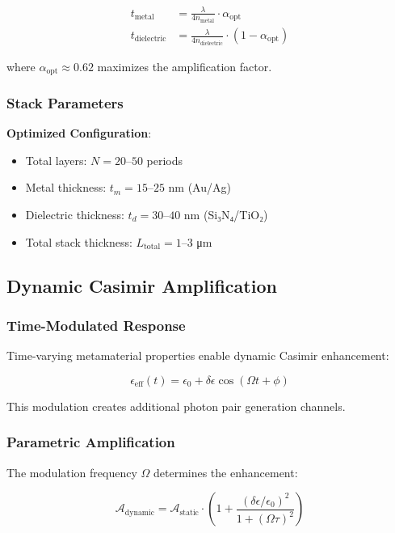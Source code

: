 \begin{align}
t_{\text{metal}} &= \frac{\lambda}{4n_{\text{metal}}} \cdot \alpha_{\text{opt}} \\
t_{\text{dielectric}} &= \frac{\lambda}{4n_{\text{dielectric}}} \cdot (1 - \alpha_{\text{opt}})
\end{align}

where $\alpha_{\text{opt}} \approx 0.62$ maximizes the amplification factor.

\subsubsection{Stack Parameters}

\textbf{Optimized Configuration}:
\begin{itemize}
\item Total layers: $N = 20$--$50$ periods
\item Metal thickness: $t_m = 15$--$25$ nm (Au/Ag)
\item Dielectric thickness: $t_d = 30$--$40$ nm (Si₃N₄/TiO₂)
\item Total stack thickness: $L_{\text{total}} = 1$--$3$ μm
\end{itemize}

\subsection{Dynamic Casimir Amplification}

\subsubsection{Time-Modulated Response}

Time-varying metamaterial properties enable dynamic Casimir enhancement:

\begin{equation}
\epsilon_{\text{eff}}(t) = \epsilon_0 + \delta\epsilon \cos(\Omega t + \phi)
\end{equation}

This modulation creates additional photon pair generation channels.

\subsubsection{Parametric Amplification}

The modulation frequency $\Omega$ determines the enhancement:

\begin{equation}
\mathcal{A}_{\text{dynamic}} = \mathcal{A}_{\text{static}} \cdot \left(1 + \frac{(\delta\epsilon/\epsilon_0)^2}{1 + (\Omega \tau)^2}\right)
\end{equation}


